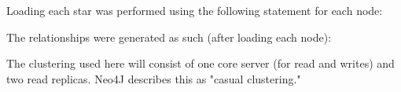 Loading each star was performed using the following statement for each node:

The relationships were generated as such (after loading each node):

The clustering used here will consist of one core server (for read and writes) and two read replicas.
Neo4J describes this as "casual clustering."

